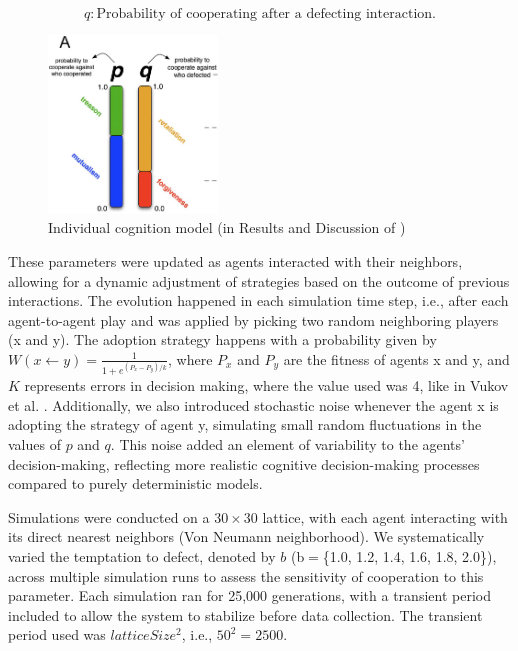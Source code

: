 \documentclass[runningheads]{llncs}
\begin{document}
\[
q: \text{Probability of cooperating after a defecting interaction.}
\]


\begin{figure}[htbp]
    \centering
    \includegraphics[width=0.4\textwidth]{modellingindividualcognition.png}
    \caption{Individual cognition model (in Results and Discussion of \cite{vukov})}
    \label{fig:coop_vs_b}
\end{figure}

These parameters were updated as agents interacted with their neighbors, allowing
for a dynamic adjustment of strategies based on the outcome of previous interactions.
The evolution happened in each simulation time step,
i.e., after each agent-to-agent play and was applied by picking two random
neighboring players (x and y). The adoption strategy happens with a probability
given by $W(x \leftarrow y) = \frac{1}{1 + e^{(P_x - P_y)/k}}$, where $P_x$ and $P_y$
are the fitness of agents x and y, and $K$ represents errors in decision making,
where the value used was 4, like in Vukov et al. \cite{vukov}.
Additionally, we also introduced stochastic noise whenever the agent x is
adopting the strategy of agent y, simulating small random fluctuations in the
values of \( p \) and \( q \).
This noise added an element of variability to the agents' decision-making,
reflecting more realistic cognitive decision-making processes compared to
purely deterministic models.


Simulations were conducted on a \( 30 \times 30 \) lattice, with each agent interacting
with its direct nearest neighbors (Von Neumann neighborhood). We systematically
varied the temptation to defect, denoted by \( b \) (b$=$\{1.0, 1.2, 1.4, 1.6, 1.8, 2.0\}), across multiple simulation
runs to assess the sensitivity of cooperation to this parameter. Each simulation
ran for 25,000 generations, with a transient period included to allow the system
to stabilize before data collection. The transient period used was $latticeSize^2$,
i.e., $50^2 = 2500$.
\end{document}
